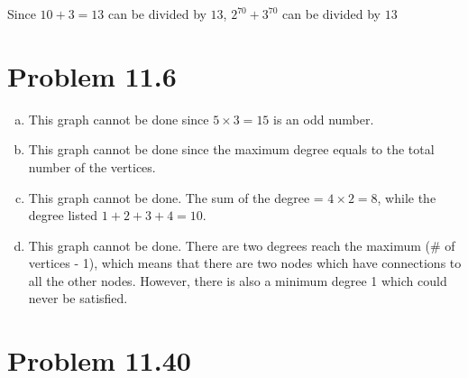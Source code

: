 \documentclass{article}
\def\math#1{$#1$}
\begin{document}
Since \math{10 + 3 = 13} can be divided by \math{13}, \math{2^{70} + 3^{70}} can be divided by \math{13}

\section{Problem 11.6}
\begin{enumerate}[a)]
    \item This graph cannot be done since \math{5 \times 3 = 15} is an odd number.
    \item This graph cannot be done since the maximum degree equals to the total number of the vertices.
    \item This graph cannot be done. The sum of the degree = \math{4 \times 2 = 8}, while the degree listed \math{1 + 2 + 3 + 4 = 10}. 
    \item This graph cannot be done. There are two degrees reach the maximum (\# of vertices - 1), which means that there are two nodes which have connections to all the other nodes. However, there is also a minimum degree 1 which could never be satisfied.
\end{enumerate}

\section{Problem 11.40}
\end{document}
